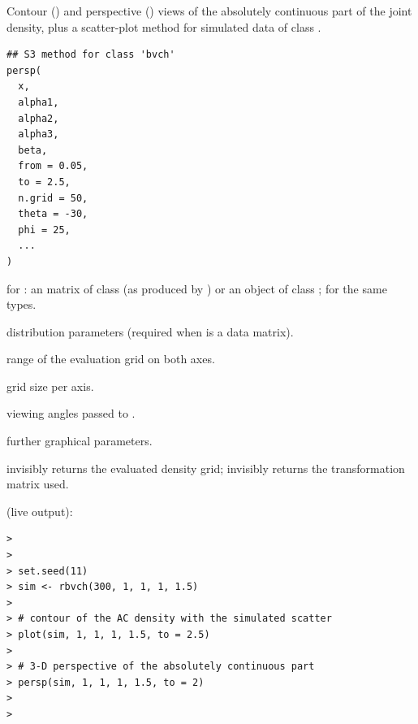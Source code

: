 \documentclass[11pt,a4paper]{article}
\begin{document}
\newpage

%
\begin{Description}
Contour () and perspective ()
views of the absolutely continuous part of the joint density,
plus a scatter-plot method for simulated data of class
.
\end{Description}
%
\begin{Usage}
\begin{verbatim}
## S3 method for class 'bvch'
persp(
  x,
  alpha1,
  alpha2,
  alpha3,
  beta,
  from = 0.05,
  to = 2.5,
  n.grid = 50,
  theta = -30,
  phi = 25,
  ...
)
\end{verbatim}
\end{Usage}
%
\begin{Arguments}
\begin{ldescription}
\item[\code{x}] for : an  matrix of class
 (as produced by ) or an object
of class ; for  the same types.

\item[\code{alpha1}, \code{alpha2}, \code{alpha3}, \code{beta}] distribution parameters (required
when  is a data matrix).

\item[\code{from}, \code{to}] range of the evaluation grid on both axes.

\item[\code{n.grid}] grid size per axis.

\item[\code{theta}, \code{phi}] viewing angles passed to .

\item[\code{...}] further graphical parameters.
\end{ldescription}
\end{Arguments}
%
\begin{Value}
 invisibly returns the evaluated density
grid;  invisibly returns the transformation
matrix used.
\end{Value}
%


\vspace{0.8em}
 (live output):
\begin{lstlisting}
> 
> 
> set.seed(11)
> sim <- rbvch(300, 1, 1, 1, 1.5)
> 
> # contour of the AC density with the simulated scatter
> plot(sim, 1, 1, 1, 1.5, to = 2.5)
> 
> # 3-D perspective of the absolutely continuous part
> persp(sim, 1, 1, 1, 1.5, to = 2)
> 
> 
\end{lstlisting}
\end{document}
